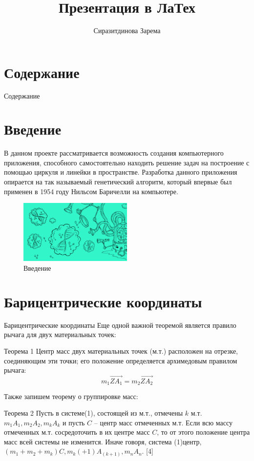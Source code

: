 \documentclass[professionalfonts, aspectratio=169]{beamer}
\title{Презентация в ЛаТех}
\author{Сиразитдинова Зарема}
\institute{Генетический алгоритм}
\begin{document}
\def\beamer@andinst{\\[5em]}
\frame{\titlepage}
\section*{Содержание}
\begin{frame}{Содержание}
	\tableofcontents[]
\end{frame}
\section{Введение}
\begin{frame}[fragile=singleslide]{\insertsectionhead}
  \framesubtitle{\insertsubsectionhead}
В данном проекте рассматривается возможность создания компьютерного приложения, способного самостоятельно находить решение задач на построение с помощью циркуля и линейки в пространстве.  Разработка данного приложения опирается на так называемый генетический алгоритм, который впервые был применен в 1954 году Нильсом Баричелли на компьютере.
\begin{figure}
\includegraphics[width=0.5\textwidth]{введение.png} 
\caption{\label{fig:1}Введение}
\end{figure}
\end{frame}

\section{Барицентрические координаты}
\begin{frame}{Барицентрические координаты}
Еще одной важной теоремой является правило рычага для двух материальных точек:
\begin{block}{Теорема 1}
Центр масс двух материальных точек (м.т.) расположен на отрезке, соединяющим эти точки; его положение определяется архимедовым правилом рычага: $$m_1\overrightarrow{ZA_1}=m_2\overrightarrow{ZA_2}$$
\end{block}   
Также запишем теорему о группировке масс:
\begin{block}{Теорема 2}
Пусть в системе(1), состоящей из м.т., отмечены $k$ м.т.$m_1 A_1,m_2 A_2,m_k A_k$ и пусть $C$ – центр масс отмеченных м.т. Если всю массу отмеченных м.т. сосредоточить в их центре масс $C$, то от этого положение центра масс всей системы не изменится. Иначе говоря, система (1)центр, $(m_1+m_2+m_k )C,m_k(+1) A_(k+1) ,m_n A_n. $  [4] 
\end{block} 
\end{frame}
\end{document}

